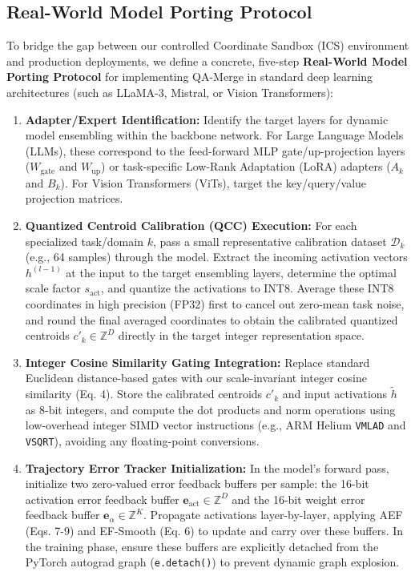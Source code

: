 \documentclass{article}
\theoremstyle{plain}
\theoremstyle{definition}
\theoremstyle{remark}
\begin{document}
\subsection{Real-World Model Porting Protocol}
To bridge the gap between our controlled Coordinate Sandbox (ICS) environment and production deployments, we define a concrete, five-step \textbf{Real-World Model Porting Protocol} for implementing QA-Merge in standard deep learning architectures (such as LLaMA-3, Mistral, or Vision Transformers):
\begin{enumerate}
    \item \textbf{Adapter/Expert Identification:} Identify the target layers for dynamic model ensembling within the backbone network. For Large Language Models (LLMs), these correspond to the feed-forward MLP gate/up-projection layers ($W_{\text{gate}}$ and $W_{\text{up}}$) or task-specific Low-Rank Adaptation (LoRA) adapters ($A_k$ and $B_k$). For Vision Transformers (ViTs), target the key/query/value projection matrices.
    \item \textbf{Quantized Centroid Calibration (QCC) Execution:} For each specialized task/domain $k$, pass a small representative calibration dataset $\mathcal{D}_k$ (e.g., 64 samples) through the model. Extract the incoming activation vectors $h^{(l-1)}$ at the input to the target ensembling layers, determine the optimal scale factor $s_{\text{act}}$, and quantize the activations to INT8. Average these INT8 coordinates in high precision (FP32) first to cancel out zero-mean task noise, and round the final averaged coordinates to obtain the calibrated quantized centroids $c'_k \in \mathbb{Z}^D$ directly in the target integer representation space.
    \item \textbf{Integer Cosine Similarity Gating Integration:} Replace standard Euclidean distance-based gates with our scale-invariant integer cosine similarity (Eq. 4). Store the calibrated centroids $c'_k$ and input activations $\tilde{h}$ as 8-bit integers, and compute the dot products and norm operations using low-overhead integer SIMD vector instructions (e.g., ARM Helium \texttt{VMLAD} and \texttt{VSQRT}), avoiding any floating-point conversions.
    \item \textbf{Trajectory Error Tracker Initialization:} In the model's forward pass, initialize two zero-valued error feedback buffers per sample: the 16-bit activation error feedback buffer $\mathbf{e}_{\text{act}} \in \mathbb{Z}^D$ and the 16-bit weight error feedback buffer $\mathbf{e}_{\alpha} \in \mathbb{Z}^K$. Propagate activations layer-by-layer, applying AEF (Eqs. 7-9) and EF-Smooth (Eq. 6) to update and carry over these buffers. In the training phase, ensure these buffers are explicitly detached from the PyTorch autograd graph (\texttt{e.detach()}) to prevent dynamic graph explosion.

\end{enumerate}
\end{document}

